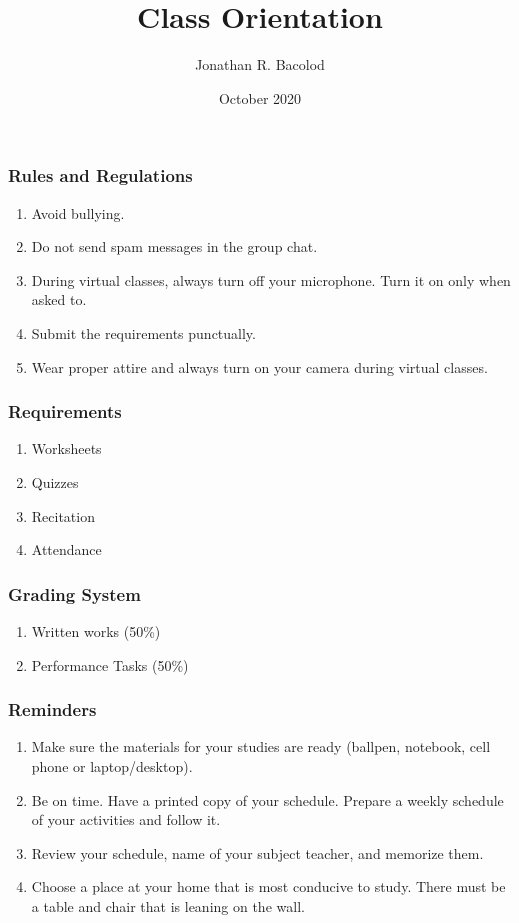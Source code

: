 \documentclass[14pt]{beamer}
\title[] {Class Orientation}
\author{Jonathan R. Bacolod}
\institute[SHS]{Sauyo High School}
\date{October 2020}
\begin{document}
	\frame{\titlepage}
	
	\begin{frame}
		\frametitle{Rules and Regulations}
		\begin{enumerate}
			\item<1-> Avoid bullying.
			\item<2-> Do not send spam messages in the group chat.
			\item<3-> During virtual classes, always turn off your microphone. Turn it on only when asked to.
			\item<4-> Submit the requirements punctually.
			\item<5-> Wear proper attire and always turn on your camera during virtual classes.
		\end{enumerate}
	\end{frame}

    \begin{frame}
    	\frametitle{Requirements}
    	\begin{enumerate}
    		\item<1-> Worksheets
    		\item<2-> Quizzes
    		\item<3-> Recitation
    		\item<4-> Attendance
    	\end{enumerate}
    \end{frame}

    \begin{frame}
    	\frametitle{Grading System}
    	\begin{enumerate}
    		\item<1-> Written works (50\%)
    		\item<2-> Performance Tasks (50\%)
    	\end{enumerate}
    \end{frame}
	
	\begin{frame}
		\frametitle{Reminders}
	    \begin{enumerate}
	    	\item<1-> Make sure the materials for your studies are ready (ballpen, notebook, cell phone or laptop/desktop).
	    	\item<2-> Be on time. Have a printed copy of your schedule. Prepare a weekly schedule of your activities and follow it.
	    	\item<3-> Review your schedule, name of your subject teacher, and memorize them.
	    	\item<4-> Choose a place at your home that is most conducive to study. There must be a table and chair that is leaning on the wall.
	    \end{enumerate}
	\end{frame}
	
\end{document}
